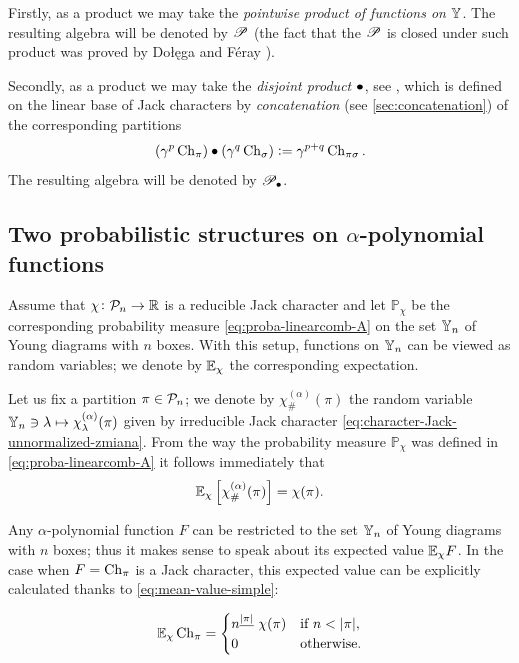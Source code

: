 \documentclass[12pt,usenames,dvipsnames,svgnames,table]{amsart}
\begin{document}
Firstly, as a product we may take the \emph{pointwise product of functions on $\mathbb{Y}$}.
The resulting algebra will be denoted by $\mathscr{P}$ (the fact that the $\mathscr{P}$ is closed under 
such product was proved by Dołęga and F\'eray
\cite[Theorem 1.4]{DolegaFeray2014}).

Secondly, as a product we may take the \emph{disjoint product $\bullet$}, see
\cite[Section 2.3]{Sniady-AsymptoticsJack}, which
is defined on the linear base of Jack characters by
\emph{concatenation} (see \cref{sec:concatenation}) of the corresponding partitions
\[ \left( \gamma^p \operatorname{Ch}_\pi\right) \bullet \left( \gamma^q \operatorname{Ch}_\sigma\right):= \gamma^{p+q} \operatorname{Ch}_{\pi \sigma}.\]
The resulting algebra will be denoted by
$\mathscr{P}_\bullet$.

\subsection{Two probabilistic structures on $\alpha$-polynomial functions}
\label{sec:probabilistic-structures}

Assume that $\chi\colon\mathcal{P}_{n}\to\mathbb{R}$ is a reducible Jack character 
and let $\mathbb{P}_\chi$ be the corresponding probability measure \eqref{eq:proba-linearcomb-A}
on the set $\mathbb{Y}_{n}$ of Young diagrams with $n$ boxes.
With this setup, functions on $\mathbb{Y}_{n}$ can be viewed as random variables;
we denote by $\mathbb{E}_\chi$ the corresponding expectation. 

\medskip

Let us fix a partition $\pi\in\mathcal{P}_{n}$;
we denote by 
$\chi^{(\alpha)}_\# (\pi)$ the random variable 
$\mathbb{Y}_{n}\ni\lambda\mapsto \chi^{(\alpha)}_\lambda (\pi)$ given by
irreducible Jack character \eqref{eq:character-Jack-unnormalized-zmiana}.
From the way the probability measure $\mathbb{P}_\chi$ was defined 
in \eqref{eq:proba-linearcomb-A} it follows immediately that
\begin{equation}
\label{eq:mean-value-simple}
\mathbb{E}_\chi\left[ \chi^{(\alpha)}_\# (\pi) \right] =  \chi(\pi).   
\end{equation}

\bigskip

Any $\alpha$-polynomial function $F$ can be restricted to the set $\mathbb{Y}_{n}$ of
Young diagrams with $n$ boxes; thus it makes sense to speak about its
expected value $\mathbb{E}_\chi F$. In the case when $F=\operatorname{Ch}_\pi$ is a 
Jack character, this expected value can be explicitly calculated thanks to \eqref{eq:mean-value-simple}:

\begin{equation}
\label{eq:what-is-normalized-character}
\mathbb{E}_\chi \operatorname{Ch}_{\pi}=
\begin{cases}
n^{\underline{|\pi|}}\ \chi(\pi) & \text{if }n < |\pi|, \\
0                                        & \text{otherwise.}
\end{cases}
\end{equation}
\end{document}
